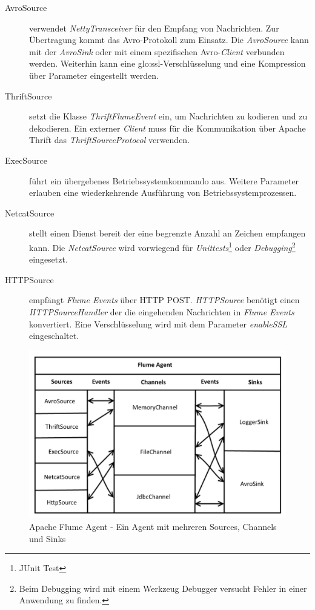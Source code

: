 \begin{description}
	\item[AvroSource] verwendet \textit{NettyTransceiver} für den Empfang von Nachrichten. Zur Übertragung kommt das Avro-Protokoll zum Einsatz. Die \textit{AvroSource} kann mit der \textit{AvroSink} oder mit einem spezifischen Avro-\textit{Client} verbunden werden. Weiterhin kann eine \gls{glo:ssl}-Verschlüsselung und eine Kompression über Parameter eingestellt werden.
	\item[ThriftSource] setzt die Klasse \textit{ThriftFlumeEvent} ein, um Nachrichten zu kodieren und zu dekodieren. Ein externer \textit{Client} muss für die Kommunikation über Apache Thrift das \textit{ThriftSourceProtocol} verwenden. 
	\item[ExecSource] führt ein übergebenes Betriebssystemkommando aus. Weitere Parameter erlauben eine wiederkehrende Ausführung von Betriebssystemprozessen.
	\item[NetcatSource] stellt einen Dienst bereit der eine begrenzte Anzahl an Zeichen empfangen kann. Die \textit{NetcatSource} wird vorwiegend für \textit{Unittests}\footnote{JUnit Test } oder \textit{Debugging}\footnote{Beim Debugging wird mit einem Werkzeug Debugger versucht Fehler in einer Anwendung zu finden.} eingesetzt. 
	\item[HTTPSource] empfängt \textit{Flume Events} über HTTP POST. \textit{HTTPSource} benötigt einen \textit{HTTPSourceHandler} der die eingehenden Nachrichten in \textit{Flume Events} konvertiert. Eine Verschlüsselung wird mit dem Parameter \textit{enableSSL} eingeschaltet. 
\end{description}

\begin{figure}[htb!]
\centering
\includegraphics[width=1.0\textwidth]{bilder/flumeAgent.png}
\caption{Apache Flume Agent - Ein Agent mit mehreren Sources, Channels und Sinks
\label{fig:flumeAgent}}
\end{figure}

